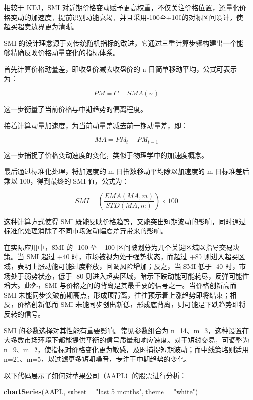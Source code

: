 \documentclass[]{ctexbook}
\newenvironment{Shaded}{\begin{snugshade}}{\end{snugshade}}
\newcommand{\AttributeTok}[1]{\textcolor[rgb]{0.13,0.29,0.53}{#1}}
\newcommand{\FunctionTok}[1]{\textcolor[rgb]{0.13,0.29,0.53}{\textbf{#1}}}
\newcommand{\NormalTok}[1]{#1}
\newcommand{\StringTok}[1]{\textcolor[rgb]{0.31,0.60,0.02}{#1}}
\begin{document}
相较于 KDJ，SMI 对近期价格变动赋予更高权重，不仅关注价格位置，还量化价格变动的加速度，提前识别动能衰竭，并且采用-100至+100的对称区间设计，使超买超卖边界更为清晰。

SMI 的设计理念源于对传统随机指标的改进，它通过三重计算步骤构建出一个能够精确反映价格动量变化的指标体系。

首先计算价格动量差，即收盘价减去收盘价的 n 日简单移动平均，公式可表示为：

\[PM = C - SMA(n)\]

这一步衡量了当前价格与中期趋势的偏离程度。

接着计算动量加速度，为当前动量差减去前一期动量差，即：

\[MA = PM_t - PM_{t-1}\]

这一步捕捉了价格变动速度的变化，类似于物理学中的加速度概念。

最后通过标准化处理，将加速度的 m 日指数移动平均除以加速度的 m 日标准差后乘以 100，得到最终的 SMI 值，公式为：

\[ 
SMI = \left( \frac{EMA(MA, m)}{STD(MA, m)} \right) \times 100
\]

这种计算方式使得 SMI 既能反映价格趋势，又能突出短期波动的影响，同时通过标准化处理消除了不同市场波动幅度差异带来的影响。

在实际应用中，SMI 的 -100 至 +100 区间被划分为几个关键区域以指导交易决策。当 SMI 超过 +40 时，市场被视为处于强势状态，而超过 +80 则进入超买区域，表明上涨动能可能过度释放，回调风险增加；反之，当 SMI 低于 -40 时，市场处于弱势状态，低于 -80 则进入超卖区域，暗示下跌动能可能耗尽，反弹可能性增大。此外，SMI 与价格之间的背离是其最重要的信号之一。当价格创新高而 SMI 未能同步突破前期高点，形成顶背离，往往预示着上涨趋势即将结束；相反，价格创新低而 SMI 未能同步创出新低，形成底背离，则可能是下跌趋势即将反转的信号。

SMI 的参数选择对其性能有重要影响。常见参数组合为 n=14、m=3，这种设置在大多数市场环境下都能提供平衡的信号质量和响应速度。对于短线交易，可调整为 n=9、m=2，使指标对价格变化更为敏感，及时捕捉短期波动；而中线策略则适用 n=21、m=5，以过滤更多短期噪音，专注于中期趋势的变化。

以下代码展示了如何对苹果公司（AAPL）的股票进行分析：

\begin{Shaded}
\begin{Highlighting}[]
\FunctionTok{chartSeries}\NormalTok{(AAPL, }\AttributeTok{subset =} \StringTok{"last 5 months"}\NormalTok{, }\AttributeTok{theme =} \StringTok{"white"}\NormalTok{)}
\end{Highlighting}
\end{Shaded}
\end{document}
